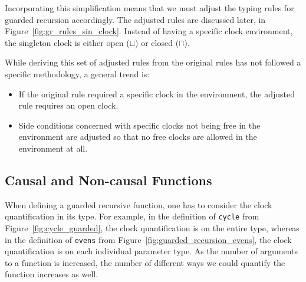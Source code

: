Incorporating this simplification means that we must adjust the typing rules for
guarded recursion accordingly. The adjusted rules are discussed later, in
Figure~\ref{fig:gr_rules_sin_clock}. Instead of having a specific clock
environment, the singleton clock is either open ($\sqcup$) or closed ($\sqcap$). 

While deriving this set of adjusted rules from the original rules has not followed a specific
methodology, a general trend is:

\begin{itemize}
\item If the original rule required a specific clock in the environment, the
  adjusted rule requires an open clock.
\item Side conditions concerned with specific clocks not being free in the
  environment are adjusted so that no free clocks are allowed in the
  environment at all.
\end{itemize}


\subsection{Causal and Non-causal Functions}
\label{sec:causal-non-causal}
When defining a guarded recursive function, one has to consider the clock
quantification in its type. For example, in the definition of \texttt{cycle}
from Figure~\ref{fig:cycle_guarded}, the clock quantification is on
the entire type, whereas in the definition of \texttt{evens} from
Figure~\ref{fig:guarded_recursion_evens}, the clock quantification is on each
individual parameter type. As the number of arguments to a function is
increased, the number of different ways we could quantify the function increases
as well.

